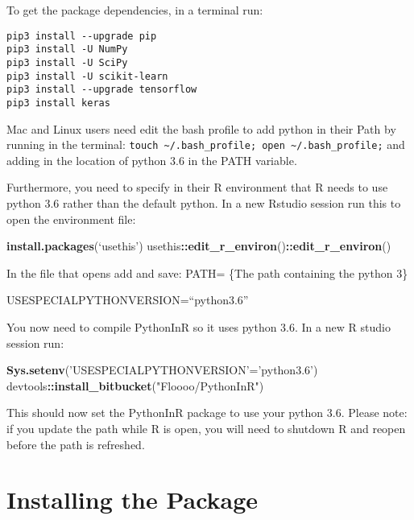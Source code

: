 \documentclass[]{article}
\newenvironment{Shaded}{\begin{snugshade}}{\end{snugshade}}
\newcommand{\KeywordTok}[1]{\textcolor[rgb]{0.13,0.29,0.53}{\textbf{#1}}}
\newcommand{\StringTok}[1]{\textcolor[rgb]{0.31,0.60,0.02}{#1}}
\newcommand{\OperatorTok}[1]{\textcolor[rgb]{0.81,0.36,0.00}{\textbf{#1}}}
\newcommand{\NormalTok}[1]{#1}
\begin{document}
To get the package dependencies, in a terminal run:

\begin{verbatim}
pip3 install --upgrade pip
pip3 install -U NumPy
pip3 install -U SciPy 
pip3 install -U scikit-learn
pip3 install --upgrade tensorflow 
pip3 install keras
\end{verbatim}

Mac and Linux users need edit the bash profile to add python in their
Path by running in the terminal:
\texttt{touch\ \textasciitilde{}/.bash\_profile;\ open\ \textasciitilde{}/.bash\_profile;}
and adding in the location of python 3.6 in the PATH variable.

Furthermore, you need to specify in their R environment that R needs to
use python 3.6 rather than the default python. In a new Rstudio session
run this to open the environment file:

\begin{Shaded}
\begin{Highlighting}[]
\KeywordTok{install.packages}\NormalTok{(‘usethis’)}
\NormalTok{usethis}\OperatorTok{::}\KeywordTok{edit_r_environ}\NormalTok{()}\OperatorTok{::}\KeywordTok{edit_r_environ}\NormalTok{()}
\end{Highlighting}
\end{Shaded}

In the file that opens add and save: PATH= \{The path containing the
python 3\}

USESPECIALPYTHONVERSION=``python3.6''

You now need to compile PythonInR so it uses python 3.6. In a new R
studio session run:

\begin{Shaded}
\begin{Highlighting}[]
\KeywordTok{Sys.setenv}\NormalTok{(}\StringTok{'USESPECIALPYTHONVERSION'}\NormalTok{=}\StringTok{'python3.6'}\NormalTok{)}
\NormalTok{devtools}\OperatorTok{::}\KeywordTok{install_bitbucket}\NormalTok{(}\StringTok{"Floooo/PythonInR"}\NormalTok{)}
\end{Highlighting}
\end{Shaded}

This should now set the PythonInR package to use your python 3.6. Please
note: if you update the path while R is open, you will need to shutdown
R and reopen before the path is refreshed.

\section{Installing the Package}\label{installing-the-package}
\end{document}

